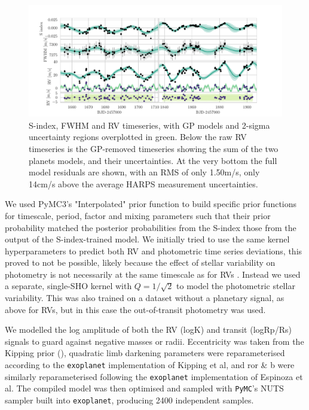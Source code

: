 \documentclass[fleqn,usenatbib]{mnras}
\begin{document}
\onecolumn
\begin{figure}
	\includegraphics[width=\columnwidth]{Combined_RV_plots_3_GPs.pdf}
    \caption{S-index, FWHM and RV timeseries, with GP models and 2-sigma uncertainty regions overplotted in green. Below the raw RV timeseries is the GP-removed timeseries showing the sum of the two planets models, and their uncertainties. At the very bottom the full model residuals are shown, with an RMS of only 1.50m/s, only 14cm/s above the average HARPS measurement uncertainties.}
    \label{fig:RVs}
\end{figure}
\twocolumn

We used PyMC3's "Interpolated" prior function to build specific prior functions for timescale, period, factor and mixing parameters such that their prior probability matched the posterior probabilities from the S-index those from the output of the S-index-trained model.
We initially tried to use the same kernel hyperparameters to predict both RV and photometric time series deviations, this proved to not be possible, likely because the effect of stellar variability on photometry is not necessarily at the same timescale as for RVs \citep{10.1111/j.1365-2966.2011.19960.x}.
Instead we used a separate, single-SHO kernel with $Q=1/\sqrt{2}$ to model the photometric stellar variability.
This was also trained on a dataset without a planetary signal, as above for RVs, but in this case the out-of-transit photometry was used.

We modelled the log amplitude of both the RV (logK) and transit (logRp/Rs) signals to guard against negative masses or radii.
Eccentricity was taken from the Kipping prior (), quadratic limb darkening parameters were reparameterised according to the \texttt{exoplanet} implementation of Kipping et al, and ror \& b were similarly reparameterised following the \texttt{exoplanet} implementation of Espinoza et al.
The compiled model was then optimised and sampled with \texttt{PyMC}'s NUTS sampler built into \texttt{exoplanet}, producing 2400 independent samples.
\end{document}
